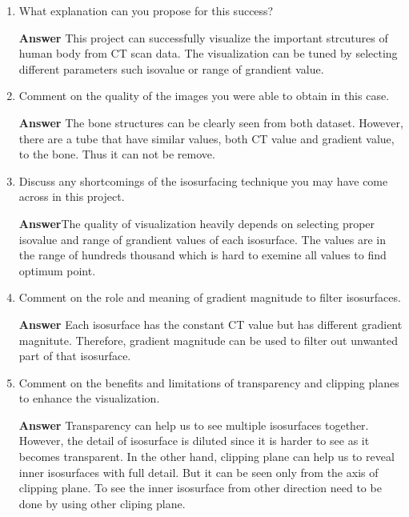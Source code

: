 \documentclass[11pt]{article}
\begin{document}
\begin{enumerate}[label=\arabic*.]

\item What explanation can you propose for this success?

\noindent\textbf{Answer} This project can successfully visualize the important strcutures of human body from CT scan data. The visualization can be tuned by selecting different parameters such isovalue or range of grandient value.

\item Comment on the quality of the images you were able to obtain in this case.

\noindent\textbf{Answer} The bone structures can be clearly seen from both dataset. However, there are a tube that have similar values, both CT value and gradient value, to the bone. Thus it can not be remove.

\item Discuss any shortcomings of the isosurfacing technique you may have come across in this project.

\noindent\textbf{Answer}The quality of visualization heavily depends on selecting proper isovalue and range of grandient values of each isosurface. The values are in the range of hundreds thousand which is hard to exemine all values to find optimum point. 

\item Comment on the role and meaning of gradient magnitude to filter isosurfaces. 

\noindent\textbf{Answer} Each isosurface has the constant CT value but has different gradient magnitute. Therefore, gradient magnitude can be used to filter out unwanted part of that isosurface. 

\item Comment on the benefits and limitations of transparency and clipping planes to enhance the visualization.

\noindent\textbf{Answer} Transparency can help us to see multiple isosurfaces together. However, the detail of isosurface is diluted since it is harder to see as it becomes transparent.
 In the other hand, clipping plane can help us to reveal inner isosurfaces with full detail. But it can be seen only from the axis of clipping plane. To see the inner isosurface from other direction need to be done by using other cliping plane.

\end{enumerate}
\end{document}
